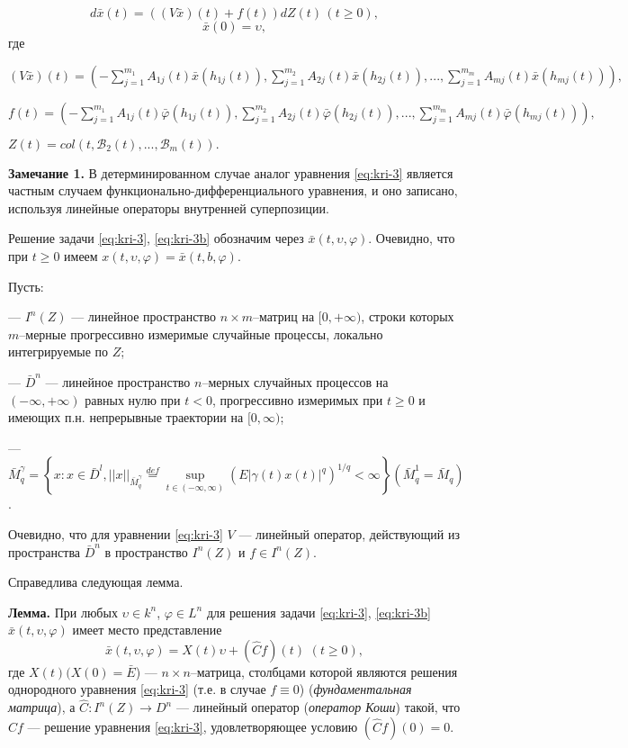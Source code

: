 \begin{equation}
    \label{eq:kri-3}
    d\bar x(t) =  ((V\bar x)(t) +f(t))dZ(t) {\,} (t \ge 0),
\end{equation}
\begin{equation}
\label{eq:kri-3b}
\bar x(0) = \upsilon,  
\end{equation}
где

$(V\bar x)(t)= \left(- \sum \limits_{j=1}^{m_1}A_{1j}(t)\bar
x(h_{1j}(t)), \sum \limits_{j=1}^{m_2}A_{2j}(t)\bar x(h_{2j}(t)),
..., \sum \limits_{j=1}^{m_m}A_{mj}(t)\bar x(h_{mj}(t))\right ),$

$f(t)= \left(- \sum \limits_{j=1}^{m_1}A_{1j}(t)\bar
\varphi(h_{1j}(t)), \sum \limits_{j=1}^{m_2}A_{2j}(t)\bar \varphi
(h_{2j}(t)), ..., \sum \limits_{j=1}^{m_m}A_{mj}(t)\bar \varphi
(h_{mj}(t))\right),$

$Z(t)= col (t, \mathcal  B_2(t), ...,\mathcal B_m(t)).$

{\bf Замечание 1.} В детерминированном случае аналог уравнения \eqref{eq:kri-3}
является частным случаем функционально-дифференциального уравнения,
и оно записано, используя линейные операторы внутренней
суперпозиции.

Решение задачи \eqref{eq:kri-3}, \eqref{eq:kri-3b} обозначим через  $\bar x(t, \upsilon,
\varphi )$. Очевидно, что при $t   \geq 0$ имеем $x(t, \upsilon,
\varphi ) = \bar x(t, b, \varphi )$.

Пусть:

---  $I^n(Z)$ --- линейное пространство $n\times m$--матриц на $[0,
+\infty )$, строки которых $m$--мерные прогрессивно измеримые
случайные процессы, локально интегрируемые по $Z$;

---  $\bar D^n$ --- линейное пространство $n$--мерных случайных процессов на $(-\infty ,
+\infty )$ равных нулю при $t < 0$, прогрессивно измеримых при $t
\geq 0$ и имеющих п.н. непрерывные траектории на  $[0, \infty )$;

--- $\bar M_q^{\gamma } = \left \{x: x \in \bar D^l, ||x||_{\bar M_q^\gamma }
 \mathrel
 {\mathop {=} \limits ^{def}} \mathrel {\mathop {\sup}
 \limits _{t \in (-\infty, \infty )}} (E|\gamma (t)x(t)|^q)^{1/q} < \infty \right \}  (
 \bar M_q^1 = \bar M_q)$.

Очевидно, что  для уравнении \eqref{eq:kri-3} $V$  --- линейный оператор,
действующий из пространства $\bar D^n$ в пространство $I^n(Z)$ и $f
\in  I^n(Z)$.

Справедлива следующая  лемма.

\textbf {Лемма.}  При любых  $\upsilon \in k^n$, $\varphi \in L^n$
для решения задачи \eqref{eq:kri-3}, \eqref{eq:kri-3b}  $\bar x(t, \upsilon, \varphi)$ имеет
место представление
\begin{equation}
\label{eq:kri-4}
\bar x(t,\upsilon , \varphi) = X(t)\upsilon +(\hat Cf)(t){\,\,} (t
\ge 0), 
\end{equation}
где $X(t)(X(0) = \bar E$) --- $n \times n$--матрица, столбцами
которой являются решения однородного уравнения \eqref{eq:kri-3} (т.е. в случае $f
\equiv 0$) ({\it фундаментальная матрица}), а $\hat C:I^n(Z)
\rightarrow D^n$
--- линейный оператор ({\it оператор Коши}) такой, что
$\hat Cf$ --- решение уравнения \eqref{eq:kri-3}, удовлетворяющее условию $(\hat
Cf)(0) = 0$.

